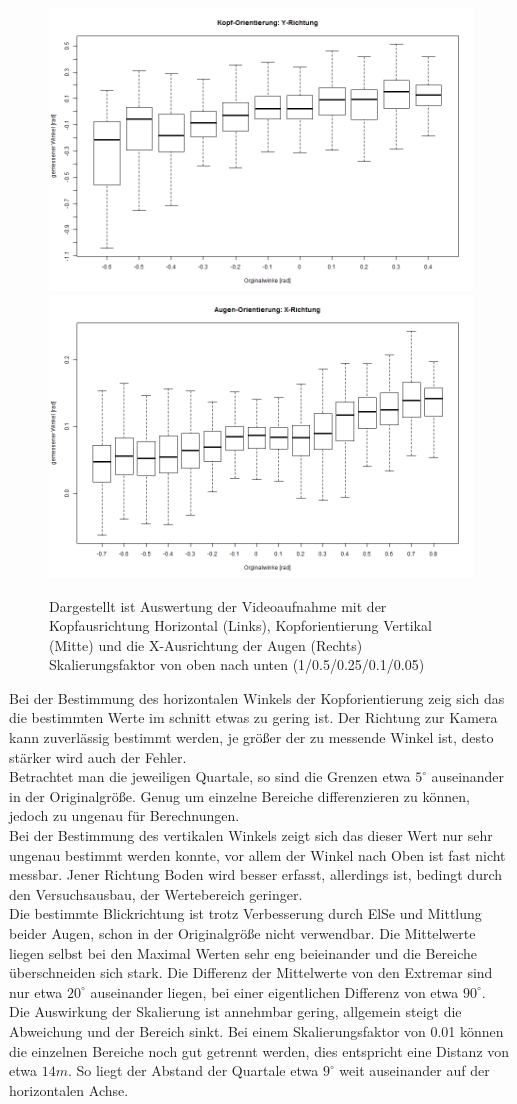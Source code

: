 \begin{figure}
	\includegraphics[width=0.3\linewidth]{OpenFace_Img/Head_y_S005}
	\includegraphics[width=0.3\linewidth]{OpenFace_Img/EyeAVG_x_S005}
	\caption{Dargestellt ist Auswertung der Videoaufnahme mit der Kopfausrichtung Horizontal (Links), Kopforientierung Vertikal (Mitte) und die X-Ausrichtung der Augen (Rechts)\\Skalierungsfaktor von oben nach unten (1/0.5/0.25/0.1/0.05)}
	\label{graph_VideoSkalierung}
\end{figure}
Bei der Bestimmung des horizontalen Winkels der Kopforientierung zeig sich das die bestimmten Werte im schnitt etwas zu gering ist. Der Richtung zur Kamera kann zuverlässig bestimmt werden, je größer der zu messende Winkel ist, desto  stärker wird auch der Fehler.\\
Betrachtet man die jeweiligen Quartale, so sind die Grenzen etwa $5^\circ$ auseinander in der Originalgröße. Genug um einzelne Bereiche differenzieren zu können, jedoch zu ungenau für Berechnungen.\\
Bei der Bestimmung des vertikalen Winkels zeigt sich das dieser Wert nur sehr ungenau bestimmt werden konnte, vor allem der Winkel nach Oben ist fast nicht messbar. Jener Richtung Boden wird besser erfasst, allerdings ist, bedingt durch den Versuchsausbau, der Wertebereich geringer.\\
Die bestimmte Blickrichtung ist trotz Verbesserung durch ElSe und Mittlung beider Augen, schon in der Originalgröße nicht verwendbar. Die Mittelwerte liegen selbst bei den Maximal Werten sehr eng beieinander und die Bereiche überschneiden sich stark. Die Differenz der Mittelwerte von den Extremar sind nur etwa $20^\circ$ auseinander liegen, bei einer eigentlichen Differenz von etwa $90^\circ$.\\
Die Auswirkung der Skalierung ist annehmbar gering, allgemein steigt die Abweichung und der Bereich sinkt. Bei einem Skalierungsfaktor von 0.01 können die einzelnen Bereiche noch gut getrennt werden, dies entspricht eine Distanz von etwa $14m$. So liegt der Abstand der Quartale etwa $9^\circ$ weit auseinander auf der horizontalen Achse.\\
